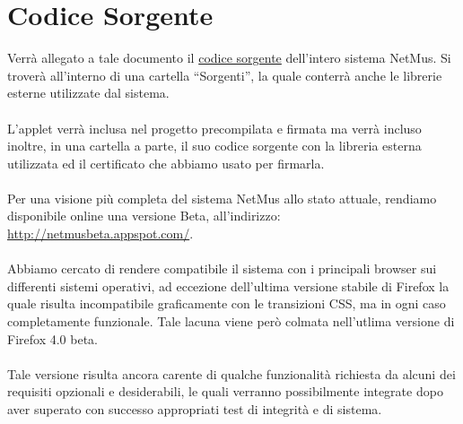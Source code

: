 \chapter{Codice Sorgente}
\thispagestyle{fancy} %

Verr\`a allegato a tale documento il \underline{codice sorgente} dell'intero
sistema NetMus. Si trover\`a all'interno di una cartella ``Sorgenti'', la quale conterr\`a anche
le librerie esterne utilizzate dal sistema.\\
\\
L'applet verr\`a inclusa nel progetto precompilata e firmata ma verr\`a incluso
inoltre, in una cartella a parte, il suo codice sorgente con la libreria
esterna utilizzata ed il certificato che abbiamo usato per firmarla.\\
\\
Per una visione pi\`u completa del sistema NetMus allo stato attuale, rendiamo
disponibile online una versione Beta, all'indirizzo:
\url{http://netmusbeta.appspot.com/}.\\
\\
Abbiamo cercato di rendere compatibile il sistema con i principali
browser sui differenti sistemi operativi, ad eccezione dell'ultima versione
stabile di Firefox la quale risulta incompatibile graficamente con le
transizioni CSS, ma in ogni caso completamente funzionale. Tale lacuna viene
per\`o colmata nell'utlima versione di Firefox 4.0 beta.\\
\\
Tale versione risulta ancora carente di qualche funzionalit\`a richiesta da
alcuni dei requisiti opzionali e desiderabili, le quali verranno possibilmente
integrate dopo aver superato con successo appropriati test di integrit\`a e di
sistema.

\listoftables
{}
\listoffigures
{}

